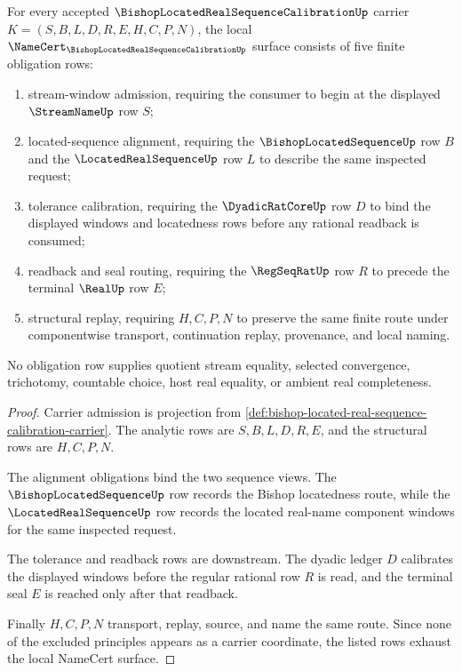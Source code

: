 \begin{theorem}
\label{thm:bishop-located-real-sequence-calibration-obligations}
For every accepted $\BishopLocatedRealSequenceCalibrationUp$ carrier $K=(S,B,L,D,R,E,H,C,P,N)$, the local $\NameCert_{\BishopLocatedRealSequenceCalibrationUp}$ surface consists of five finite obligation rows:
\begin{enumerate}
\item stream-window admission, requiring the consumer to begin at the displayed $\StreamNameUp$ row $S$;
\item located-sequence alignment, requiring the $\BishopLocatedSequenceUp$ row $B$ and the $\LocatedRealSequenceUp$ row $L$ to describe the same inspected request;
\item tolerance calibration, requiring the $\DyadicRatCoreUp$ row $D$ to bind the displayed windows and locatedness rows before any rational readback is consumed;
\item readback and seal routing, requiring the $\RegSeqRatUp$ row $R$ to precede the terminal $\RealUp$ row $E$;
\item structural replay, requiring $H,C,P,N$ to preserve the same finite route under componentwise transport, continuation replay, provenance, and local naming.
\end{enumerate}
No obligation row supplies quotient stream equality, selected convergence, trichotomy, countable choice, host real equality, or ambient real completeness.
\end{theorem}
\begin{proof}
Carrier admission is projection from \autoref{def:bishop-located-real-sequence-calibration-carrier}. The analytic rows are $S,B,L,D,R,E$, and the structural rows are $H,C,P,N$.

The alignment obligations bind the two sequence views. The $\BishopLocatedSequenceUp$ row records the Bishop locatedness route, while the $\LocatedRealSequenceUp$ row records the located real-name component windows for the same inspected request.

The tolerance and readback rows are downstream. The dyadic ledger $D$ calibrates the displayed windows before the regular rational row $R$ is read, and the terminal seal $E$ is reached only after that readback.

Finally $H,C,P,N$ transport, replay, source, and name the same route. Since none of the excluded principles appears as a carrier coordinate, the listed rows exhaust the local NameCert surface.
\end{proof}

